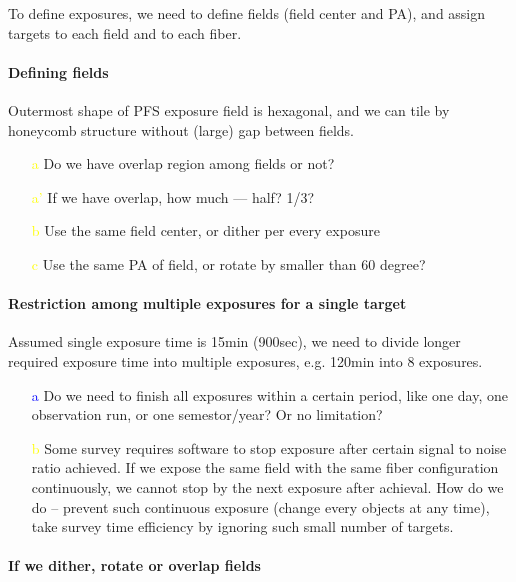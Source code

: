 \documentclass[a4paper,notitlepage]{article}
\newcommand{\colm}[1]{\textcolor{yellow}{#1}}
\newcommand{\coll}[1]{\textcolor{blue}{#1}}
\begin{document}
To define exposures, we need to define fields (field center and PA), and 
assign targets to each field and to each fiber. 

\paragraph{Defining fields}

Outermost shape of PFS exposure field is hexagonal, and we can tile by 
honeycomb structure without (large) gap between fields. 

\begin{enumerate}
  \item[\colm{a}] Do we have overlap region among fields or not?
  \item[\colm{a'}] If we have overlap, how much --- half? 1/3?
  \item[\colm{b}] Use the same field center, or dither per every exposure
  \item[\colm{c}] Use the same PA of field, or rotate by smaller than 60 degree?
\end{enumerate}


\paragraph{Restriction among multiple exposures for a single target}

Assumed single exposure time is 15min (900sec), we need to divide longer 
required exposure time into multiple exposures, e.g. 120min into 8 exposures. 

\begin{enumerate}
  \item[\coll{a}] Do we need to finish all exposures within a certain period, like 
    one day, one observation run, or one semestor/year? Or no limitation? 
  \item[\colm{b}] Some survey requires software to stop exposure after certain 
    signal to noise ratio achieved. 
    If we expose the same field with the same fiber configuration
    continuously, we cannot stop by the next exposure after achieval. 
    How do we do -- prevent such continuous exposure (change every objects 
    at any time), take survey time efficiency by ignoring such small number of 
    targets.
\end{enumerate}


\paragraph{If we dither, rotate or overlap fields}
\end{document}
